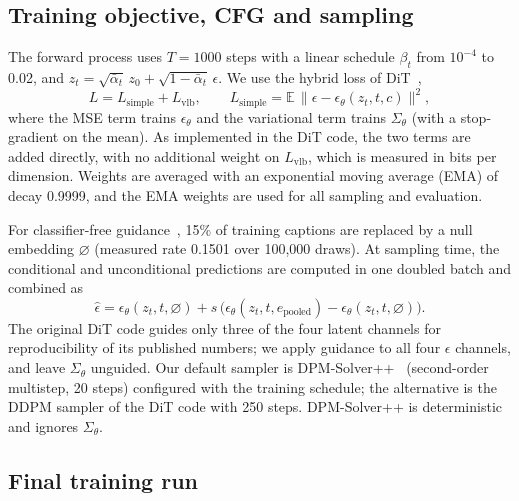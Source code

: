 \documentclass{article}
\newcommand{\nullemb}{\varnothing}
\newcommand{\epooled}{e_{\mathrm{pooled}}}
\begin{document}
\subsection{Training objective, CFG and sampling}

The forward process uses $T=1000$ steps with a linear schedule $\beta_t$ from $10^{-4}$ to 0.02, and $z_t=\sqrt{\bar\alpha_t}\,z_0+\sqrt{1-\bar\alpha_t}\,\epsilon$.
We use the hybrid loss of DiT~\cite{nichol2021improved,peebles2023dit},
\begin{equation}
  L=L_{\mathrm{simple}}+L_{\mathrm{vlb}},\qquad L_{\mathrm{simple}}=\mathbb{E}\,\big\|\epsilon-\epsilon_\theta(z_t,t,c)\big\|^2,
\end{equation}
where the MSE term trains $\epsilon_\theta$ and the variational term trains $\Sigma_\theta$ (with a stop-gradient on the mean).
As implemented in the DiT code, the two terms are added directly, with no additional weight on $L_{\mathrm{vlb}}$, which is measured in bits per dimension.
Weights are averaged with an exponential moving average (EMA) of decay 0.9999, and the EMA weights are used for all sampling and evaluation.

For classifier-free guidance~\cite{ho2022cfg}, 15\% of training captions are replaced by a null embedding $\nullemb$ (measured rate 0.1501 over 100,000 draws).
At sampling time, the conditional and unconditional predictions are computed in one doubled batch and combined as
\begin{equation}
  \hat\epsilon=\epsilon_\theta(z_t,t,\nullemb)+s\,\big(\epsilon_\theta(z_t,t,\epooled)-\epsilon_\theta(z_t,t,\nullemb)\big).
\end{equation}
The original DiT code guides only three of the four latent channels for reproducibility of its published numbers; we apply guidance to all four $\epsilon$ channels, and leave $\Sigma_\theta$ unguided.
Our default sampler is DPM-Solver++~\cite{lu2022dpmsolverpp} (second-order multistep, 20 steps) configured with the training schedule; the alternative is the DDPM sampler of the DiT code with 250 steps.
DPM-Solver++ is deterministic and ignores $\Sigma_\theta$.

\subsection{Final training run}
\end{document}
